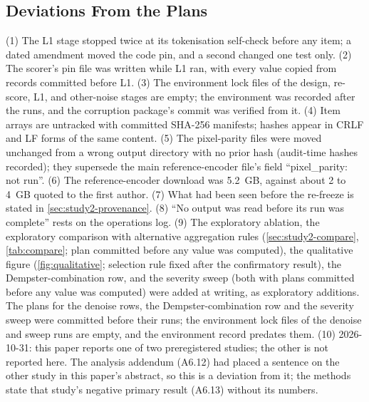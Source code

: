 \subsection{Deviations From the Plans}\label{sec:deviations}
{\small
(1) The L1 stage stopped twice at its tokenisation self-check before any item; a dated amendment moved the code pin, and a second
changed one test only.
(2) The scorer's pin file was written while L1 ran, with every value copied from records committed before L1.
(3) The environment lock files of the design, re-score, L1, and other-noise stages are empty; the environment was recorded after the runs,
and the corruption package's commit was verified from it.
(4) Item arrays are untracked with committed SHA-256 manifests; hashes appear in CRLF and LF forms of the same content.
(5) The pixel-parity files were moved unchanged from a wrong output directory with no prior hash (audit-time hashes recorded); they
supersede the main reference-encoder file's field ``pixel\_parity: not run''.
(6) The reference-encoder download was 5.2~GB, against about 2 to 4~GB quoted to the first author.
(7) What had been seen before the re-freeze is stated in \cref{sec:study2-provenance}.
(8) ``No output was read before its run was complete'' rests on the operations log.
(9) The exploratory ablation, the exploratory comparison with alternative aggregation rules (\cref{sec:study2-compare}, \cref{tab:compare}; plan committed before any value was computed), the qualitative figure (\cref{fig:qualitative}; selection rule fixed after the confirmatory result), the Dempster-combination row, and the severity sweep (both with plans committed before any value was computed) were added at writing, as exploratory additions. The plans for the denoise rows, the Dempster-combination row and the severity sweep were committed before their runs; the environment lock files of the denoise and sweep runs are empty, and the environment record predates them.
(10) 2026-10-31: this paper reports one of two preregistered studies; the other is not reported here. The analysis addendum
(A6.12) had placed a sentence on the other study in this paper's abstract, so this is a deviation from it; the methods state that study's negative primary result (A6.13) without its numbers.
}

